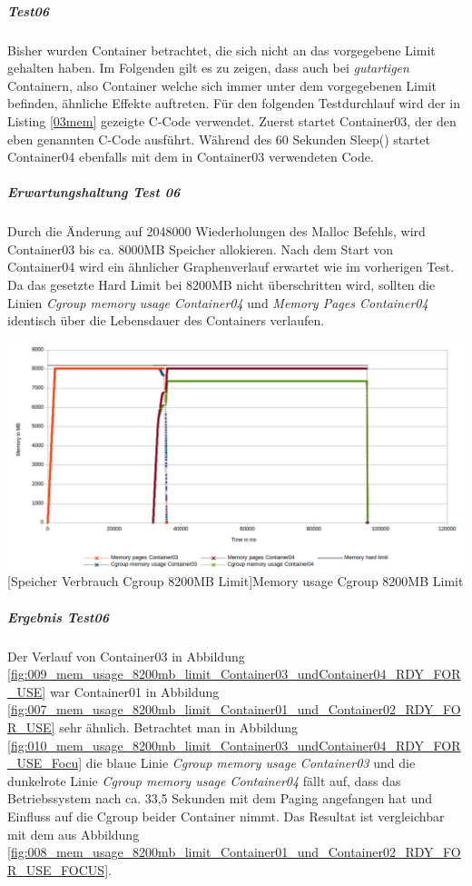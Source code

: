 \subparagraph{Test06}
Bisher wurden Container betrachtet, die sich nicht an das vorgegebene Limit gehalten haben. Im Folgenden gilt es zu zeigen, dass auch bei \emph{gutartigen} Containern, also Container welche sich immer unter dem vorgegebenen Limit befinden, ähnliche Effekte auftreten. Für den folgenden Testdurchlauf wird der in Listing \ref{03mem} gezeigte C-Code verwendet. Zuerst startet Container03, der den eben genannten C-Code ausführt. Während des 60 Sekunden Sleep() startet Container04 ebenfalls mit dem in Container03 verwendeten Code.

\vspace{1em}


\subparagraph{Erwartungshaltung Test 06}
Durch die Änderung auf 2048000 Wiederholungen des Malloc Befehls, wird Container03 bis ca. 8000MB Speicher allokieren. Nach dem Start von Container04 wird ein ähnlicher Graphenverlauf erwartet wie im vorherigen Test. Da das gesetzte Hard Limit bei 8200MB nicht überschritten wird, sollten die Linien \emph{Cgroup memory usage Container04} und \emph{Memory Pages Container04} identisch über die Lebensdauer des Containers verlaufen.

\vspace{1em}
\begin{minipage}{\linewidth}
	\centering
	\includegraphics[width=1\linewidth]{pics/009_mem_usage_8200mb_limit_Container03_undContainer04_RDY_FOR_USE.png}
	[Speicher Verbrauch Cgroup 8200MB Limit]{Memory usage Cgroup 8200MB Limit}
	\label{fig:009_mem_usage_8200mb_limit_Container03_undContainer04_RDY_FOR_USE}
\end{minipage}

\subparagraph{Ergebnis Test06}
Der Verlauf von Container03 in Abbildung \ref{fig:009_mem_usage_8200mb_limit_Container03_undContainer04_RDY_FOR_USE} war Container01 in Abbildung \ref{fig:007_mem_usage_8200mb_limit_Container01_und_Container02_RDY_FOR_USE} sehr ähnlich. Betrachtet man in Abbildung \ref{fig:010_mem_usage_8200mb_limit_Container03_undContainer04_RDY_FOR_USE_Focu} die blaue Linie \emph{Cgroup memory usage Container03} und die dunkelrote Linie \emph{Cgroup memory usage Container04} fällt auf, dass das Betriebssystem nach ca. 33,5 Sekunden mit dem Paging angefangen hat und Einfluss auf die Cgroup beider Container nimmt. Das Resultat ist vergleichbar mit dem aus Abbildung \ref{fig:008_mem_usage_8200mb_limit_Container01_und_Container02_RDY_FOR_USE_FOCUS}.  

